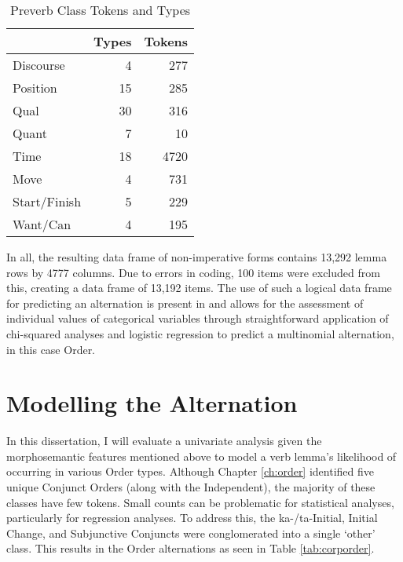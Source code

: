 \begin{table}
\centering
\begin{tabular}{lrr} \\
\toprule
             & Types & Tokens \\
\midrule

Discourse    & 4     & 277    \\
Position     & 15    & 285    \\
Qual         & 30    & 316    \\
Quant        & 7     & 10     \\
Time         & 18    & 4720   \\
Move         & 4     & 731    \\
Start/Finish & 5     & 229    \\
Want/Can     & 4     & 195   \\
\bottomrule
\end{tabular}
\caption{Preverb Class Tokens and Types \label{tab:pv}
}
\end{table}

In all, the resulting data frame of non-imperative forms contains 13,292 lemma rows by 4777 columns. Due to errors in coding, 100 items were excluded from this, creating a data frame of 13,192 items. The use of such a logical data frame for predicting an alternation is present in \citet{arppe2008univariate} and allows for the assessment of individual values of categorical variables through straightforward application of chi-squared analyses and logistic regression to predict a multinomial alternation, in this case Order. 

\section{Modelling the Alternation}
In this dissertation, I will evaluate a univariate analysis given the morphosemantic features mentioned above to model a verb lemma's likelihood of occurring in various Order types. Although Chapter \ref{ch:order} identified five unique Conjunct Orders (along with the Independent), the majority of these classes have few tokens. Small counts can be problematic for statistical analyses, particularly for regression analyses. To address this, the ka-/ta-Initial, Initial Change, and Subjunctive Conjuncts were conglomerated into  a single `other' class. This results in the Order alternations as seen in Table \ref{tab:corporder}.

